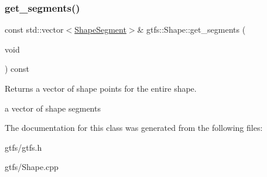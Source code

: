 \subsubsection{\texorpdfstring{get\+\_\+segments()}{get\_segments()}}
{\footnotesize\ttfamily const std\+::vector$<$\hyperlink{structgtfs_1_1ShapeSegment}{Shape\+Segment}$>$\& gtfs\+::\+Shape\+::get\+\_\+segments (\begin{DoxyParamCaption}\item[{void}]{ }\end{DoxyParamCaption}) const\hspace{0.3cm}{\ttfamily [inline]}}

\begin{DoxyReturn}{Returns}
a vector of shape points for the entire shape. 

a vector of shape segments 
\end{DoxyReturn}


The documentation for this class was generated from the following files\+:\begin{DoxyCompactItemize}
\item 
gtfs/gtfs.\+h\item 
gtfs/Shape.\+cpp\end{DoxyCompactItemize}
